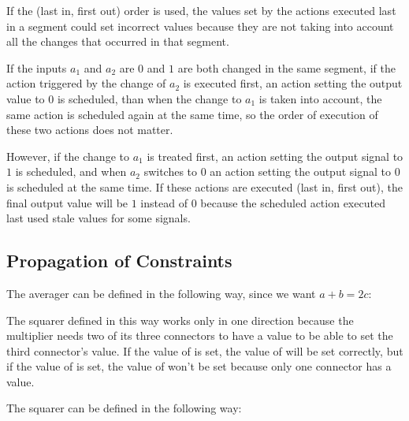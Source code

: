 \begin{exe}[3.32]
    If the (last in, first out) order is used, the values set by the actions 
    executed last in a segment could set incorrect values because they are not 
    taking into account all the changes that occurred in that segment.

    If the inputs $a_1$ and $a_2$ are $0$ and $1$ are both changed in the same 
    segment, if the action triggered by the change of $a_2$ is executed first, 
    an action setting the output value to $0$ is scheduled, than when the change 
    to $a_1$ is taken into account, the same action is scheduled again at the 
    same time, so the order of execution of these two actions does not matter.

    However, if the change to $a_1$ is treated first, an action setting the 
    output signal to $1$ is scheduled, and when $a_2$ switches to $0$ an action 
    setting the output signal to $0$ is scheduled at the same time. If these 
    actions are executed (last in, first out), the final output value will be 
    $1$ instead of $0$ because the scheduled action executed last used stale 
    values for some signals.
\end{exe}

\subsection{Propagation of Constraints}

\begin{exe}[3.33]
    The averager can be defined in the following way, since we want 
    $ a + b = 2c$:
\end{exe}

\begin{exe}[3.34]
    The squarer defined in this way works only in one direction because the 
    multiplier needs two of its three connectors to have a value to be able to 
    set the third connector’s value. If the value of  is set, the value 
    of  will be set correctly, but if the value of  is set, the 
    value of  won’t be set because only one connector has a value.
\end{exe}

\begin{exe}[3.35]
    The squarer can be defined in the following way:
\end{exe}

